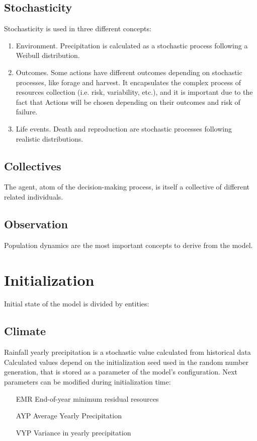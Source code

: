 \documentclass[11pt,oneside,a4paper,openright]{report}
\begin{document}
\subsection{Stochasticity}
Stochasticity is used in three different concepts:
\begin{enumerate}
\item Environment. Precipitation is calculated as a stochastic process following a Weibull
distribution.
\item Outcomes. Some actions have different outcomes depending on stochastic processes,
like forage and harvest. It encapsulates the complex process of resources collection (i.e.
risk, variability, etc.), and it is important due to the fact that Actions will be chosen
depending on their outcomes and risk of failure.
\item Life events. Death and reproduction are stochastic processes following realistic
distributions.
\end{enumerate}

\subsection{Collectives}
The agent, atom of the decision-making process, is itself a collective of different related individuals.
\subsection{Observation}
Population dynamics are the most important concepts to derive from the model.

\section{Initialization}
Initial state of the model is divided by entities:

\subsection{Climate}
Rainfall yearly precipitation is a stochastic value calculated from historical data\cite{RainDataSource}
Calculated values depend on the initialization seed used in the random number generation, that is
stored as a parameter of the model's configuration. Next parameters can be modified during
initialization time:
	\begin{enumerate}
	\item[EMR] End-of-year minimum residual resources
	\item[AYP] Average Yearly Precipitation
	\item[VYP] Variance in yearly precipitation
	\end{enumerate}
\end{document}
